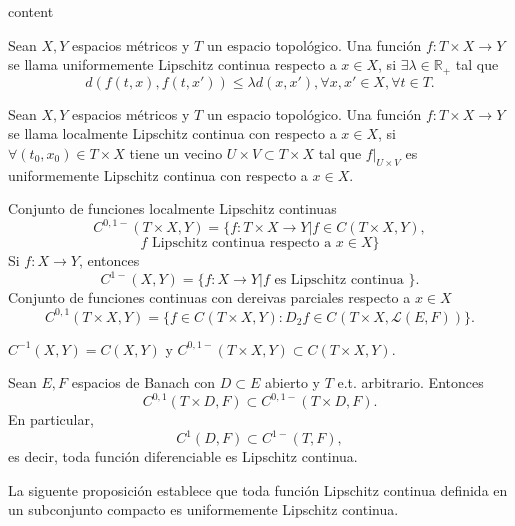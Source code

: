 \begin{dem}
  content
\end{dem}

\begin{defn}
  Sean $X, Y$ espacios métricos y $T$ un espacio topológico. Una función $f: T \times X \to Y$ se llama uniformemente Lipschitz continua respecto a $x \in X$, si $\exists \lambda \in \mathbb{R}_{+}$ tal que 
  \[ 
    d(f(t,x),f(t,x')) \leq \lambda d(x,x'), \forall x,x' \in X, \forall t \in T. 
  \] 
\end{defn}

\begin{defn}
  Sean $X, Y$ espacios métricos y $T$ un espacio topológico. Una función $f: T \times X \to Y$ se llama localmente Lipschitz continua con respecto a $x \in X$, si $\forall (t_{0}, x_{0}) \in T \times X$ tiene un vecino $ U \times V \subset T \times X$ tal que $f|_{U \times V}$ es uniformemente Lipschitz continua con respecto a $x \in X$.
\end{defn}

\begin{nota}
  Conjunto de funciones localmente Lipschitz continuas
  \[ 
    C^{0,1-}(T \times X, Y) = \{ f: T \times X \to Y | f \in C(T \times X, Y),
  \] 
  \[ 
     f \text{ Lipschitz continua respecto a } x \in X \}  
  \] 
  Si $f: X \to Y$, entonces
  \[ 
    C^{1-}(X,Y) = \{ f: X \to Y | f \text{ es Lipschitz continua } \} .
  \]
  Conjunto de funciones continuas con dereivas parciales respecto a $x \in X$
  \[ 
    C^{0,1}(T \times X, Y) = \{ f \in C^{}(T \times X, Y) : D_{2}f \in C^{}(T \times X, \mathcal{L}(E,F)) \}.
  \] 
\end{nota}

\begin{obs}
  $C^{-1}(X,Y) = C(X,Y)$ y $C^{0,1-}(T \times X, Y) \subset C(T \times X, Y)$.
\end{obs}

\begin{prop}
  Sean $E, F$ espacios de Banach con $D \subset E$ abierto y $T$ e.t. arbitrario. Entonces
  \[ 
    C^{0,1}(T \times D, F) \subset C^{0,1-}(T \times D, F). 
  \]
  En particular,
  \[ 
    C^{1}(D, F) \subset C^{1-}(T, F),
  \]
  es decir, toda función diferenciable es Lipschitz continua.
\end{prop}

\begin{note}
  La siguente proposición establece que toda función Lipschitz continua definida en un subconjunto compacto es uniformemente Lipschitz continua.
\end{note}

